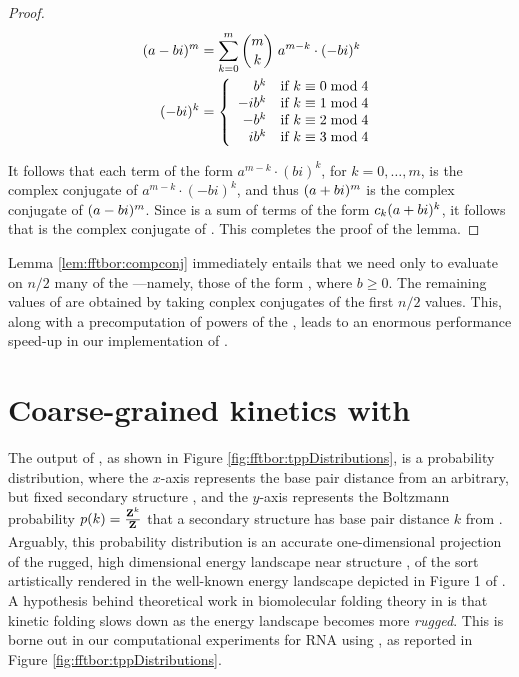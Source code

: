 \begin{proof}
\begin{align}
(a-bi)^m &= \sum_{k=0}^m {m \choose k}\; a^{m-k} \cdot (-bi)^k \\
(-bi)^k &= \left\{
\begin{array}{rl}
b^k   & \text{if $k \equiv 0 \bmod 4$} \\
-ib^k & \text{if $k \equiv 1 \bmod 4$} \\
-b^k  & \text{if $k \equiv 2 \bmod 4$} \\
ib^k  & \text{if $k \equiv 3 \bmod 4$} \\
\end{array} \right.
\end{align}

It follows that each term of the form
$a^{m-k} \cdot (bi)^k$, for $k=0,\dots,m$, is the complex conjugate of
$a^{m-k} \cdot (-bi)^k$, and thus $(a+bi)^m$ is the complex conjugate of
$(a-bi)^m$. Since \emZof{}{\aPbi} is a sum of terms of the form $c_k (a+bi)^k$,
it follows that \emZof{}{\aMbi} is the complex conjugate of \emZof{}{\aPbi}.
This completes the proof of the lemma.

\end{proof}

Lemma \ref{lem:fftbor:compconj} immediately entails that we need only to evaluate \emZ{} on $n/2$
many of the \nRoUs---namely, those of the form
\aPbi, where $b \geq 0$. The remaining values of \emZ{} are obtained by
taking conplex conjugates of the first $n/2$ values. This, along with a
precomputation of powers of the \nRoUs, leads to an
enormous performance speed-up in our implementation of \fftbor.

\section{Coarse-grained kinetics with \fftbor}
\label{sec:fftbor:kinetics}

The output of \fftbor, as shown in Figure
\ref{fig:fftbor:tppDistributions}, is a probability distribution,
where the $x$-axis represents the base pair distance from an arbitrary,
but fixed secondary structure \strSt, and the $y$-axis represents the
Boltzmann probability $p(k) = \frac{{\bf Z}^{k}_{}}{{\bf Z}^{}_{}}$ that a secondary structure
has base pair distance $k$ from \strSt. Arguably, this probability distribution
is an accurate one-dimensional projection of the rugged, high dimensional energy
landscape near structure \strSt,
of the sort artistically rendered in the well-known
energy landscape depicted in Figure 1 of \cite{Wolynes.ptam05}.
A hypothesis behind theoretical work in biomolecular folding theory in
\cite{Bryngelson.p95}
is that kinetic folding slows down as the energy landscape becomes more
{\em rugged}. This is borne out in our computational experiments for RNA
using \fftbor, as reported
in Figure \ref{fig:fftbor:tppDistributions}.

